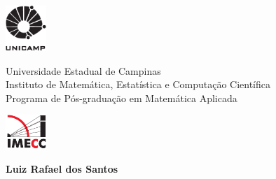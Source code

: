 \begin{titlepage}
  \thispagestyle{empty}
\noindent {\rule[-1ex]{16cm}{0.05cm}}
\begin{center}
\begin{minipage}[s]{1.5cm}
\includegraphics[width=0.6in]{figuras/unicamp.pdf}
\end{minipage}\begin{minipage}[s]{11cm}\noindent
{\begin{center} {\sffamily \Large Universidade Estadual de Campinas }\\ 
{ \sffamily Instituto de
Matem\'atica, Estat\'istica e Computa\c c\~ao Cient\'ifica}\protect \\
{\sffamily Programa de Pós-graduação em Matem\'atica Aplicada}
\end{center}}
\end{minipage}
\begin{minipage}[s]{1.5cm} 
\includegraphics[width=0.6in]{figuras/logo.pdf}
\end{minipage} 
\end{center}
\noindent{\rule[.2ex]{16cm}{0.03cm}}

\vspace{2cm} 

\begin{center}
\end{center}

\begin{center} 
  
\normalsize \vspace{10mm}

\setcounter{footnote}{1} \vspace{15mm} 
\renewcommand{\thefootnote}{\fnsymbol{footnote}}
{\Large {\bf\sffamily Luiz Rafael dos Santos}}


\end{center}
\end{titlepage}
